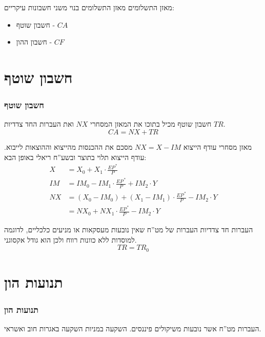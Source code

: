 \documentclass[10pt,usenames,dvipsnames]{beamer}
\begin{document}
\begin{RTL}
\begin{frame}[allowframebreaks]
\begin{block}{מאזן התשלומים}
        מאזן התשלומים בנוי משני חשבונות עיקריים:
        \begin{itemize}
            \item חשבון שוטף - $CA$
            \item חשבון ההון - $CF$
        \end{itemize}
    \end{block}

\end{frame}

\section{חשבון שוטף}
\begin{frame}[allowframebreaks]
    \frametitle{חשבון שוטף}
\begin{block}{חשבון שוטף}
        מכיל בתוכו  את המאזן המסחרי $NX$ ואת העברות החד צדדיות $TR$.
        $$
        CA = NX + TR
        $$
\end{block}

\begin{block}{מאזן מסחרי}
    עודף הייצוא $NX = X - IM$ מסכם את ההכנסות מהייצוא וההוצאות לייבוא.
    עודף הייצוא תלוי בתוצר ובשע''ח ריאלי באופן הבא:
    \begin{align*}
        X &= X_0 + X_1 \cdot \frac{E P^{\, \ast}}{P} \\
        IM &= IM_0 - IM_1 \cdot \frac{E P^{\, \ast}}{P} + IM_2 \cdot Y \\
        NX &= (X_0 - IM_0) + (X_1 - IM_1) \cdot \frac{E P^{\, \ast}}{P} - IM_2  \cdot Y \\
           &= NX_0 + NX_1 \cdot \frac{E P^{\, \ast}}{P} - IM_2 \cdot Y
    \end{align*}
\end{block}

\framebreak

\begin{block}{העברות חד צדדיות}
    העברות של מט''ח שאין נובעות מעסקאות או מניעים כלכליים, לדוגמה למוסדות ללא כוונות רווח
    ולכן הוא גודל אקסוגני.
    $$
    TR = TR_0
    $$
\end{block}
\end{frame}


\section{תנועות הון}
\begin{frame}[allowframebreaks]
    \frametitle{תנועות הון}
    העברות מט''ח אשר נובעות משיקולים פיננסים. השקעה במניות
    השקעה באגרות חוב ואשראי.
    

\end{frame}
\end{RTL}
\end{document}
